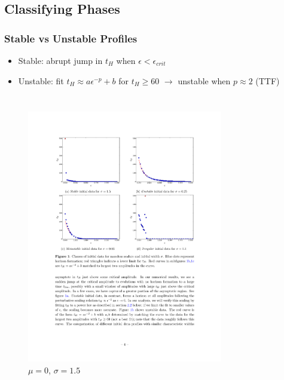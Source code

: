 \documentclass[mathserif,10pt]{beamer}
\newcommand{\bi}{\begin{itemize}}
\newcommand{\ei}{\end{itemize}}
\newcommand{\its}{\item}
\begin{document}
{\subsection{Classifying Phases}
\frame
{
  \frametitle{Stable vs Unstable Profiles}
  \bi
  \its Stable: abrupt jump in $t_H$ when $\epsilon < \epsilon_{crit}$
  \its<2->{Unstable: fit $t_H \approx a \epsilon^{-p} + b$ for $t_H \geq 60$ $\to$ unstable when $p \approx 2$ (TTF)}
  \ei
  \begin{columns}
    \begin{figure}
    \centering
    \includegraphics[scale=0.75]{m0w15} \\ $\mu =0$, $\sigma =1.5$
    \end{figure}
    \begin{figure}
    \centering

\end{figure}
\end{columns}}}
\end{document}
